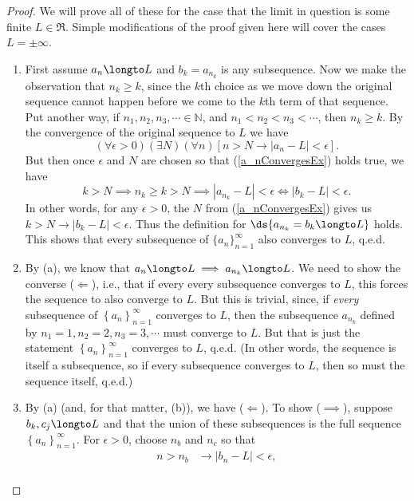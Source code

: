 \begin{proof}
We will prove all of these for the case that the limit in question is some
finite $L\in\Re$.  Simple modifications of the proof given
here will cover the cases $L=\pm\infty$.

\begin{enumerate}[\bf(a)]
\item
First assume $a_n\longto L$ and $b_k=a_{n_k}$ is any subsequence.
Now we make the observation that $n_k\ge k$, since the
$k$th choice as we move down the original sequence cannot happen 
before we come to the $k$th term of that sequence.  Put another
way, if $n_1,n_2,n_3,\cdots\in\mathbb{N}$, and $n_1<n_2<n_3<\cdots$,
then  $n_k\ge k$.  By the convergence of the original
sequence to $L$ we have
\begin{equation}(\forall\epsilon>0)(\exists N)(\forall n)\left[n>N
\longrightarrow\left|a_n-L\right|<\epsilon\right].\label{a_nConvergesEx}
\end{equation}
But then once $\epsilon$ and $N$ are chosen
so that (\ref{a_nConvergesEx}) holds true, we have
$$k>N\implies n_k\ge k>N\implies \left|a_{n_k}-L\right|<\epsilon
\iff\left|b_k-L\right|<\epsilon.$$
In other words, for any $\epsilon>0$, the $N$ from (\ref{a_nConvergesEx})
gives us $k>N\longrightarrow\left|b_k-L\right|<\epsilon$.  Thus
the definition for $\ds{a_{n_k}=b_k\longto L}$ holds.
This shows that every subsequence of $\{a_n\}_{n=1}^\infty$
also converges to $L$, q.e.d.
\item By (a), we know that $a_n\longto L\implies a_{n_k}\longto L$.
We need to show the converse ($\Longleftarrow$), i.e., that if every
every subsequence converges  to $L$, this forces the sequence
to also converge to $L$.  But this
is trivial, since, if {\it every} subsequence
of $\left\{a_n\right\}_{n=1}^\infty$ converges to $L$, then
the subsequence $a_{n_k}$ defined by $n_1=1,n_2=2,n_3=3,\cdots$ 
must converge to $L$.  But that is just the statement 
$\left\{a_n\right\}_{n=1}^\infty$ converges to $L$, q.e.d.
(In other words, the sequence is itself a subsequence, so 
if every subsequence converges to $L$, then so must the sequence
itself, q.e.d.) 
\item By (a) (and, for that matter, (b)), we have ($\Longleftarrow$).
To show ($\implies$), suppose $b_k,c_j\longto L$ and that
the union of these subsequences is the full sequence 
$\left\{a_n\right\}_{n=1}^\infty$.
For $\epsilon>0$, choose $n_b$ and $n_c$ so that
\begin{align*}
n>n_b&\longrightarrow\left|b_n-L\right|<\epsilon,\\

\end{align*}
\end{enumerate}
\end{proof}
